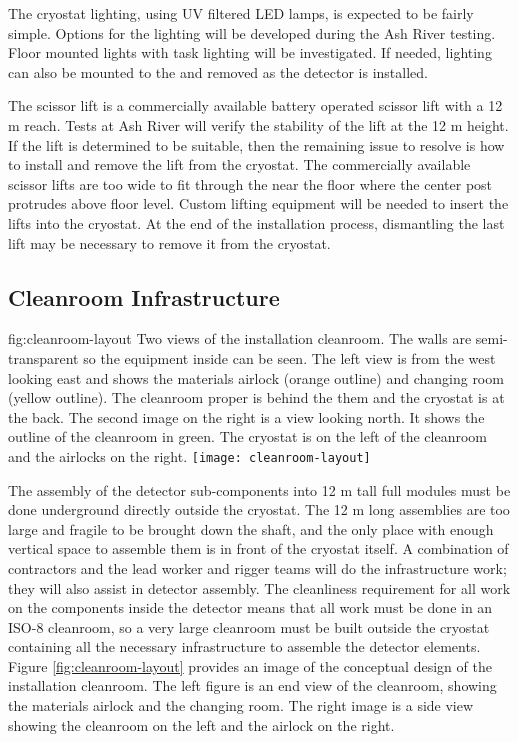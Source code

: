 The cryostat lighting, using UV filtered LED lamps, is expected to be fairly simple. Options for the lighting will be developed during the Ash River testing. Floor mounted lights with task lighting will be investigated. If needed, lighting can also be mounted to the  and removed as the detector is installed.

The scissor lift is a commercially available battery operated scissor lift with a 12 \si{m} reach. Tests at Ash River will verify the stability of the lift at the 12 \si{m} height. If the lift is determined to be suitable, then the remaining issue to resolve is how to install and remove the lift from the cryostat. The commercially available scissor lifts are too wide to fit through the  near the floor where the center post protrudes above floor level. Custom lifting equipment will be needed to insert the lifts into the cryostat. At the end of the installation process, dismantling the last lift may be necessary to remove it from the cryostat.

\clearpage

\subsection{Cleanroom Infrastructure}
\label{sec:fdsp-tc-infr-comm}

\begin{dunefigure}{fig:cleanroom-layout}
  {Two views of the installation cleanroom. The walls are semi-transparent so the equipment inside can be seen. The left view is from the west looking east and shows the materials airlock (orange outline) and changing room (yellow outline). The cleanroom proper is behind the them and the cryostat is at the back. The second image on the right is a view looking north. It shows the outline of the cleanroom in green. The cryostat is on the left of the cleanroom and the airlocks on the right.} 
\texttt{[image: cleanroom-layout]}
\end{dunefigure}

The assembly of the detector sub-components into 12 \si{m} tall full modules must be done underground directly outside the cryostat. The 12 \si{m} long assemblies are too large and fragile to be brought down the shaft, and the only place with enough vertical space to assemble them is in front of the cryostat itself. A combination of contractors and the lead worker and rigger teams will do the infrastructure work; they will also assist in detector assembly. The cleanliness requirement for all work on the components inside the detector means that all work must be done in an ISO-8 cleanroom, so a very large cleanroom must be built outside the cryostat containing all the necessary infrastructure to assemble the detector  elements. Figure \ref{fig:cleanroom-layout} provides an image of the conceptual design of the installation cleanroom. The left figure is an end view of the cleanroom, showing the materials airlock and the changing room. The right image is a side view showing the cleanroom on the left and the airlock on the right.

